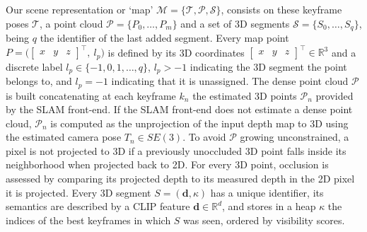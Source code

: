 Our scene representation or `map' $\mathcal{M} = \{ \mathcal{T}, \mathcal{P}, \mathcal{S} \}$, consists on these keyframe poses $\mathcal{T}$, a point cloud $\mathcal{P} = \{P_0, \hdots, P_m\}$ and a set of 3D segments $\mathcal{S} = \{S_0, \hdots, S_q\}$, being $q$ the identifier of the last added segment. 
Every map point $P = \big( \begin{bmatrix}
x & y & z
\end{bmatrix}^\top, \ l_p \big)$ is defined by its 3D coordinates $\begin{bmatrix}
x & y & z 
\end{bmatrix}^\top \in \mathbb{R}^3$ and a discrete label $l_p \in \{-1, 0, 1, \hdots, q\}$, $l_p>-1$ indicating the 3D segment the point belongs to, and $l_p=-1$ indicating that it is unassigned. 
The dense point cloud \(\mathcal{P}\) is built concatenating at each keyframe \(k_n\) the estimated 3D points \(\mathcal{P}_n\) provided by the SLAM front-end. 
If the SLAM front-end does not estimate a dense point cloud, \(\mathcal{P}_n\) is computed as the unprojection of the input depth map to 3D using the estimated camera pose \(T_{n} \in SE(3)\). To avoid \(\mathcal{P}\) growing unconstrained, a pixel is not projected to 3D if a previously unoccluded 3D point falls inside its neighborhood when projected back to 2D. 
For every 3D point, occlusion is assessed by comparing its projected depth to its measured depth in the 2D pixel it is projected.
Every 3D segment $S = \left( \mathbf{d}, \kappa \right)$ has a unique identifier, its semantics are described by a CLIP feature $\mathbf{d} \in \mathbb{R}^d$, and stores in a heap $\kappa$ the indices of the best keyframes in which $S$ was seen, ordered by visibility scores.
